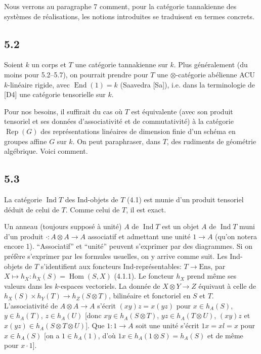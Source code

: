 \documentclass[12pt,a4paper]{article}
\theoremstyle{plain}
\theoremstyle{definition}
\theoremstyle{remark}
\DeclareMathOperator{\Hom}{Hom}
\DeclareMathOperator{\End}{End}
\DeclareMathOperator{\Ind}{Ind}
\DeclareMathOperator{\Rep}{Rep}
\begin{document}
Nous verrons au paragraphe 7 comment, pour la catégorie tannakienne des systèmes de réalisations, les notions introduites se traduisent en termes concrets.

\subsection*{5.2}
Soient $k$ un corps et $T$ une catégorie tannakienne sur $k$. Plus généralement (du moins pour 5.2--5.7), on pourrait prendre pour $T$ une $\otimes$-catégorie abélienne ACU $k$-linéaire rigide, avec $\End(1) = k$ (Saavedra [Sa]), i.e. dans la terminologie de [D4] une catégorie tensorielle sur $k$.

Pour nos besoins, il suffirait du cas où $T$ est équivalente (avec son produit tensoriel et ses données d'associativité et de commutativité) à la catégorie $\Rep(G)$ des représentations linéaires de dimension finie d'un schéma en groupes affine $G$ sur $k$. On peut paraphraser, dans $T$, des rudiments de géométrie algébrique. Voici comment.

\subsection*{5.3}
La catégorie $\Ind T$ des Ind-objets de $T$ (4.1) est munie d'un produit tensoriel déduit de celui de $T$. Comme celui de $T$, il est exact.

Un anneau (toujours supposé à unité) $A$ de $\Ind T$ est un objet $A$ de $\Ind T$ muni d'un produit $\cdot: A 
\otimes A 
\to A$ associatif et admettant une unité $1 
\to A$ (qu'on notera encore 1). ``Associatif'' et ``unité'' peuvent s'exprimer par des diagrammes. Si on préfère s'exprimer par les formules usuelles, on y arrive comme suit. Les Ind-objets de $T$ s'identifient aux foncteurs Ind-représentables: $T 
\to 
\text{Ens}$, par $X 
\mapsto h_X: h_X(S) = 
\Hom(S,X)$ (4.1.1). Le foncteur $h_X$ prend même ses valeurs dans les $k$-espaces vectoriels. La donnée de $X 
\otimes Y 
\to Z$ équivaut à celle de $h_X(S) 
\times h_Y(T) 
\to h_Z(S 
\otimes T)$, bilinéaire et fonctoriel en $S$ et $T$. L'associativité de $A 
\otimes A 
\to A$ s'écrit $(xy)z = x(yz)$ pour $x 
\in h_A(S)$, $y 
\in h_A(T)$, $z 
\in h_A(U)$ [donc $xy 
\in h_A(S 
\otimes T)$, $yz 
\in h_A(T 
\otimes U)$, $(xy)z$ et $x(yz) 
\in h_A(S 
\otimes T 
\otimes U)$]. Que $1: 1 
\to A$ soit une unité s'écrit $1x = xl = x$ pour $x 
\in h_A(S)$ [on a $1 
\in h_A(1)$, d'où $1x 
\in h_A(1 
\otimes S) = h_A(S)$ et de même pour $x 
\cdot 1$].
\end{document}
